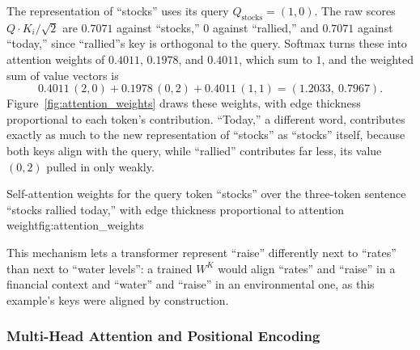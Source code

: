 \documentclass[../ai_in_finance]{subfiles}
\begin{document}
The representation of ``stocks'' uses its query $Q_{\text{stocks}} = (1,0)$. The raw scores $Q \cdot K_i / \sqrt{2}$ are $0.7071$ against ``stocks,'' $0$ against ``rallied,'' and $0.7071$ against ``today,'' since ``rallied''s key is orthogonal to the query. Softmax turns these into attention weights of $0.4011$, $0.1978$, and $0.4011$, which sum to $1$, and the weighted sum of value vectors is
\begin{equation*}
0.4011\,(2,0) + 0.1978\,(0,2) + 0.4011\,(1,1) = (1.2033,\ 0.7967).
\end{equation*}
Figure~\ref{fig:attention_weights} draws these weights, with edge thickness proportional to each token's contribution. ``Today,'' a different word, contributes exactly as much to the new representation of ``stocks'' as ``stocks'' itself, because both keys align with the query, while ``rallied'' contributes far less, its value $(0,2)$ pulled in only weakly.

\begin{bookfigure}{Self-attention weights for the query token ``stocks'' over the three-token sentence ``stocks rallied today,'' with edge thickness proportional to attention weight}{fig:attention_weights}
\end{bookfigure}

This mechanism lets a transformer represent ``raise'' differently next to ``rates'' than next to ``water levels'': a trained $W^K$ would align ``rates'' and ``raise'' in a financial context and ``water'' and ``raise'' in an environmental one, as this example's keys were aligned by construction.

\subsubsection*{Multi-Head Attention and Positional Encoding}
\end{document}
